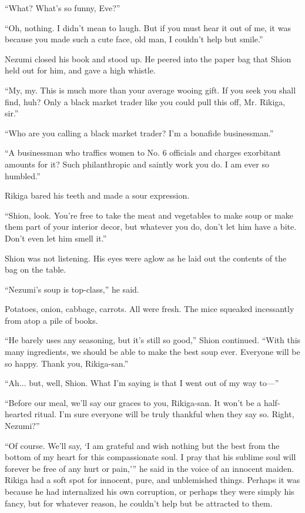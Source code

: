 ``What? What's so funny, Eve?''

``Oh, nothing. I didn't mean to laugh. But if you must hear it out of
me, it was because you made such a cute face, old man, I couldn't help
but smile.''

Nezumi closed his book and stood up. He peered into the paper bag that
Shion held out for him, and gave a high whistle.

``My, my. This is much more than your average wooing gift. If you seek
you shall find, huh? Only a black market trader like you could pull this
off, Mr. Rikiga, sir.''

``Who are you calling a black market trader? I'm a bonafide
businessman.''

``A businessman who traffics women to No. 6 officials and charges
exorbitant amounts for it? Such philanthropic and saintly work you do. I
am ever so humbled.''

Rikiga bared his teeth and made a sour expression.

``Shion, look. You're free to take the meat and vegetables to make soup
or make them part of your interior decor, but whatever you do, don't let
him have a bite. Don't even let him smell it.''

Shion was not listening. His eyes were aglow as he laid out the contents
of the bag on the table.

``Nezumi's soup is top-class,'' he said.

Potatoes, onion, cabbage, carrots. All were fresh. The mice squeaked
incessantly from atop a pile of books.

``He barely uses any seasoning, but it's still so good,'' Shion
continued. ``With this many ingredients, we should be able to make the
best soup ever. Everyone will be so happy. Thank you, Rikiga-san.''

``Ah... but, well, Shion. What I'm saying is that I went out of my way
to---''

``Before our meal, we'll say our graces to you, Rikiga-san. It won't be
a half-hearted ritual. I'm sure everyone will be truly thankful when
they say so. Right, Nezumi?''

``Of course. We'll say, `I am grateful and wish nothing but the best
from the bottom of my heart for this compassionate soul. I pray that his
sublime soul will forever be free of any hurt or pain,''' he said in the
voice of an innocent maiden. Rikiga had a soft spot for innocent, pure,
and unblemished things. Perhaps it was because he had internalized his
own corruption, or perhaps they were simply his fancy, but for whatever
reason, he couldn't help but be attracted to them.

